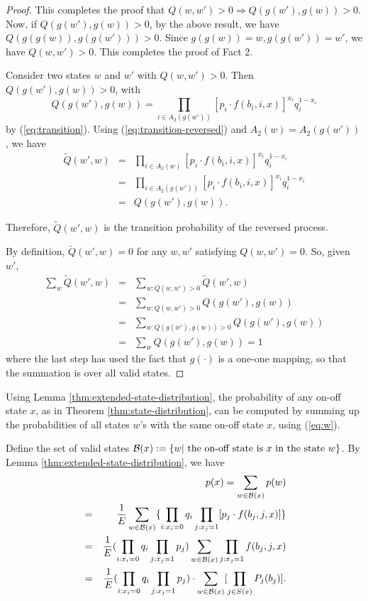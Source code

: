 \documentclass{IEEEtran}
\begin{document}
\begin{proof}
This completes the proof that $Q(w,w')>0\Rightarrow Q(g(w'),g(w))>0$.
Now, if $Q(g(w'),g(w))>0$, by the above result, we have $Q(g(g(w)),g(g(w')))>0$.
Since $g(g(w))=w,g(g(w'))=w'$, we have $Q(w,w')>0$. This completes
the proof of Fact 2.

Consider two states $w$ and $w'$ with $Q(w,w')>0$. Then $Q(g(w'),g(w))>0$,
with \[
Q(g(w'),g(w))=\prod_{i\in A_{2}(g(w'))}[p_{i}\cdot f(b_{i},i,x)]^{x_{i}}q_{i}^{1-x_{i}}\]
by (\ref{eq:transition}). Using (\ref{eq:transition-reversed}) and
$A_{2}(w)=A_{2}(g(w'))$, we have \begin{eqnarray}
\tilde{Q}(w',w) & = & \prod_{i\in A_{2}(w)}[p_{i}\cdot f(b_{i},i,x)]^{x_{i}}q_{i}^{1-x_{i}}\nonumber \\
 & = & \prod_{i\in A_{2}(g(w'))}[p_{i}\cdot f(b_{i},i,x)]^{x_{i}}q_{i}^{1-x_{i}}\nonumber \\
 & = & Q(g(w'),g(w)).\label{eq:prob-equal}\end{eqnarray}


Therefore, $\tilde{Q}(w',w)$ is the transition probability of the
reversed process. 

By definition, $\tilde{Q}(w',w)=0$ for any $w,w'$ satisfying $Q(w,w')=0$.
So, given $w'$,\begin{eqnarray*}
\sum_{w}\tilde{Q}(w',w) & = & \sum_{w:Q(w,w')>0}\tilde{Q}(w',w)\\
 & = & \sum_{w:Q(w,w')>0}Q(g(w'),g(w))\\
 & = & \sum_{w:Q(g(w'),g(w))>0}Q(g(w'),g(w))\\
 & = & \sum_{w}Q(g(w'),g(w))=1\end{eqnarray*}
where the last step has used the fact that $g(\cdot)$ is a one-one
mapping, so that the summation is over all valid states.
\end{proof}
\medskip{}
Using Lemma \ref{thm:extended-state-distribution}, the probability
of any on-off state $x$, as in Theorem \ref{thm:state-distribution},
can be computed by summing up the probabilities of all states $w$'s
with the same on-off state $x$, using (\ref{eq:w}). 

Define the set of valid states ${\cal B}(x):=\{w|\text{ the on-off state is }x\text{ in the state }w\}$.
By Lemma \ref{thm:extended-state-distribution}, we have\begin{eqnarray}
 &  & p(x)=\sum_{w\in{\cal B}(x)}p(w)\nonumber \\
 & = & \frac{1}{E}\sum_{w\in{\cal B}(x)}\{\prod_{i:x_{i}=0}q_{i}\prod_{j:x_{j}=1}[p_{j}\cdot f(b_{j},j,x)]\}\nonumber \\
 & = & \frac{1}{E}(\prod_{i:x_{i}=0}q_{i}\prod_{j:x_{j}=1}p_{j})\sum_{w\in{\cal B}(x)}\prod_{j:x_{j}=1}f(b_{j},j,x)\nonumber \\
 & = & \frac{1}{E}(\prod_{i:x_{i}=0}q_{i}\prod_{j:x_{j}=1}p_{j})\cdot\sum_{w\in{\cal B}(x)}[\prod_{j\in S(x)}P_{j}(b_{j})].\label{eq:step1}\end{eqnarray}
\end{document}
